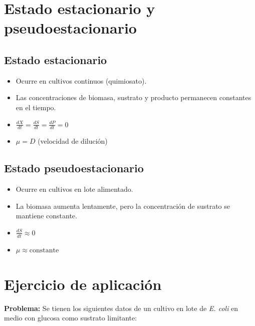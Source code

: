 \section{Estado estacionario y pseudoestacionario}

\subsection{Estado estacionario}
\begin{itemize}
    \item Ocurre en cultivos continuos (quimiosato).
    \item Las concentraciones de biomasa, sustrato y producto permanecen constantes en el tiempo.
    \item $\frac{dX}{dt} = \frac{dS}{dt} = \frac{dP}{dt} = 0$
    \item $\mu = D$ (velocidad de dilución)
\end{itemize}

\subsection{Estado pseudoestacionario}
\begin{itemize}
    \item Ocurre en cultivos en lote alimentado.
    \item La biomasa aumenta lentamente, pero la concentración de sustrato se mantiene constante.
    \item $\frac{dS}{dt} \approx 0$
    \item $\mu \approx \text{constante}$
\end{itemize}


\section{Ejercicio de aplicación}

\textbf{Problema:} Se tienen los siguientes datos de un cultivo en lote de \textit{E. coli} en medio con glucosa como sustrato limitante:

